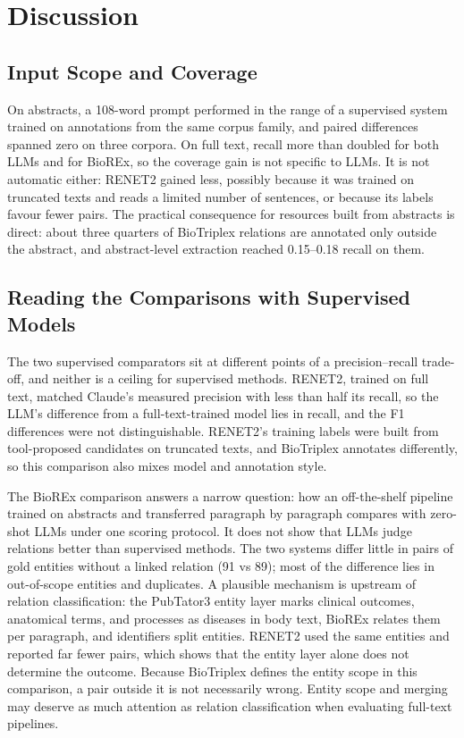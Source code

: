 \documentclass[preprint,10pt,letterpaper]{elsarticle}
\begin{document}
\section{Discussion}

\subsection{Input Scope and Coverage}
On abstracts, a 108-word prompt performed in the range of a supervised system trained on annotations from the same corpus family, and paired differences spanned zero on three corpora. On full text, recall more than doubled for both LLMs and for BioREx, so the coverage gain is not specific to LLMs. It is not automatic either: RENET2 gained less, possibly because it was trained on truncated texts and reads a limited number of sentences, or because its labels favour fewer pairs. The practical consequence for resources built from abstracts is direct: about three quarters of BioTriplex relations are annotated only outside the abstract, and abstract-level extraction reached 0.15--0.18 recall on them.

\subsection{Reading the Comparisons with Supervised Models}
The two supervised comparators sit at different points of a precision--recall trade-off, and neither is a ceiling for supervised methods. RENET2, trained on full text, matched Claude's measured precision with less than half its recall, so the LLM's difference from a full-text-trained model lies in recall, and the F1 differences were not distinguishable. RENET2's training labels were built from tool-proposed candidates on truncated texts, and BioTriplex annotates differently, so this comparison also mixes model and annotation style.

The BioREx comparison answers a narrow question: how an off-the-shelf pipeline trained on abstracts and transferred paragraph by paragraph compares with zero-shot LLMs under one scoring protocol. It does not show that LLMs judge relations better than supervised methods. The two systems differ little in pairs of gold entities without a linked relation (91 vs 89); most of the difference lies in out-of-scope entities and duplicates. A plausible mechanism is upstream of relation classification: the PubTator3 entity layer marks clinical outcomes, anatomical terms, and processes as diseases in body text, BioREx relates them per paragraph, and identifiers split entities. RENET2 used the same entities and reported far fewer pairs, which shows that the entity layer alone does not determine the outcome. Because BioTriplex defines the entity scope in this comparison, a pair outside it is not necessarily wrong. Entity scope and merging may deserve as much attention as relation classification when evaluating full-text pipelines.
\end{document}
